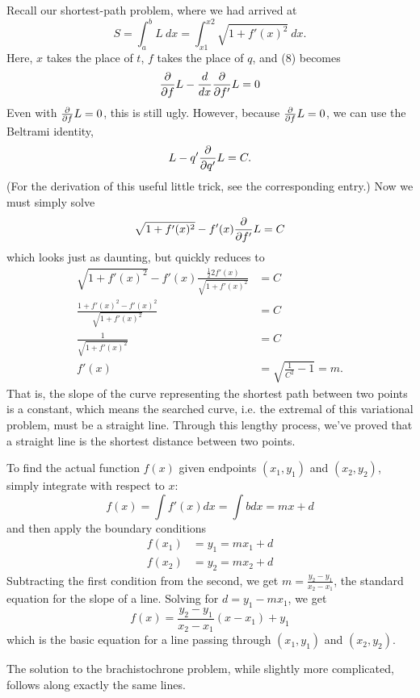 \documentclass[12pt]{article}
\newcommand{\md}{d}
\newcommand{\mderiv}[1]{\frac{\md}{\md {#1}}} %
\newcommand{\mvar}{t}
\begin{document}
Recall our shortest-path problem, where we had arrived at
\begin{equation}
S = \int_{a}^{b} L\ dx = \int_{x1}^{x2} \sqrt{1 + f'(x)^2}\ dx.
\end{equation}
Here, $x$ takes the place of $\mvar$, $f$ takes the place of $q$, and (8) becomes
\begin{equation}
\mpderiv{f} L - \mderiv{x}{\mpderiv{f'} L} = 0
\end{equation}
Even with $\frac{\partial}{\partial {f}} L = 0$, this is still ugly.  However, because $\frac{\partial}{\partial {f}}L = 0$, we can use the Beltrami identity,
\begin{equation}
L - q' {\frac{\partial}{\partial {q'}} L} = C.
\end{equation}
(For the derivation of this useful little trick, see the corresponding entry.)  Now we must simply solve
\begin{equation}
\sqrt{1 + f'(x)^2} - f'(x) {\frac{\partial}{\partial {f'}} L} = C
\end{equation}
which looks just as daunting, but quickly reduces to
\begin{align}
\sqrt{1 + f'(x)^2} - f'(x)\frac{\frac{1}{2}2f'(x)}{\sqrt{1 + f'(x)^2}} &= C\\
\frac{1 + f'(x)^2 - f'(x)^2}{\sqrt{1 + f'(x)^2}} &= C\\
\frac{1}{\sqrt{1 + f'(x)^2}} &= C\\
f'(x) &= \sqrt{\frac{1}{C^2} - 1} = m.
\end{align}
That is, the slope of the curve representing the shortest path between two points is a constant, which means the searched curve, i.e. the extremal of this variational problem, must be a straight line.  Through this lengthy process, we've proved that a straight line is the shortest distance between two points.

To find the actual function $f(x)$ given endpoints $(x_1,y_1)$ and $(x_2,y_2)$, simply integrate with respect to $x$:
\begin{equation}
f(x) = \int f'(x) dx = \int b dx = mx + d
\end{equation}
and then apply the boundary conditions
\begin{align}
f(x_1) &= y_1 = mx_1 + d\\
f(x_2) &= y_2 = mx_2 + d
\end{align}
Subtracting the first condition from the second, we get $m = \frac{y_2 - y_1}{x_2 - x_1}$, the standard equation for the slope of a line.  Solving for $d = y_1 - mx_1$, we get
\begin{equation}
f(x) = \frac{y_2 - y_1}{x_2 - x_1}(x - x_1) + y_1
\end{equation}
which is the basic equation for a line passing through $(x_1,y_1)$ and $(x_2,y_2)$.

The solution to the brachistochrone problem, while slightly more complicated, follows along exactly the same lines.
\end{document}
